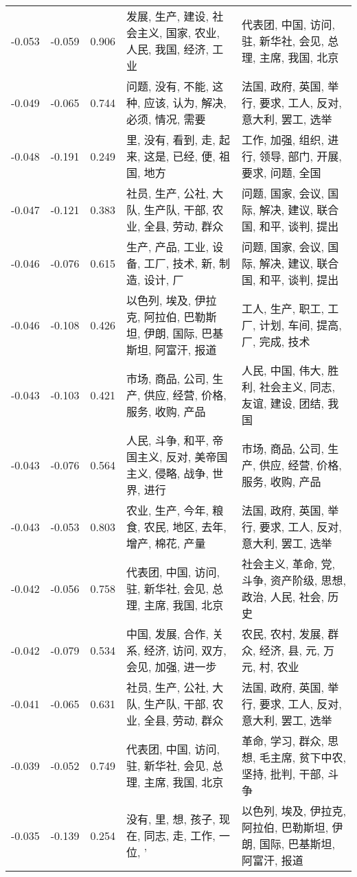 \begin{tabular}{cccp{5cm}p{5cm}}
-0.053 & -0.059 & 0.906 & 发展, 生产, 建设, 社会主义, 国家, 农业, 人民, 我国, 经济, 工业 & 代表团, 中国, 访问, 驻, 新华社, 会见, 总理, 主席, 我国, 北京 \\
-0.049 & -0.065 & 0.744 & 问题, 没有, 不能, 这种, 应该, 认为, 解决, 必须, 情况, 需要 & 法国, 政府, 英国, 举行, 要求, 工人, 反对, 意大利, 罢工, 选举 \\
-0.048 & -0.191 & 0.249 & 里, 没有, 看到, 走, 起来, 这是, 已经, 便, 祖国, 地方 & 工作, 加强, 组织, 进行, 领导, 部门, 开展, 要求, 问题, 全国 \\
-0.047 & -0.121 & 0.383 & 社员, 生产, 公社, 大队, 生产队, 干部, 农业, 全县, 劳动, 群众 & 问题, 国家, 会议, 国际, 解决, 建议, 联合国, 和平, 谈判, 提出 \\
-0.046 & -0.076 & 0.615 & 生产, 产品, 工业, 设备, 工厂, 技术, 新, 制造, 设计, 厂 & 问题, 国家, 会议, 国际, 解决, 建议, 联合国, 和平, 谈判, 提出 \\
-0.046 & -0.108 & 0.426 & 以色列, 埃及, 伊拉克, 阿拉伯, 巴勒斯坦, 伊朗, 国际, 巴基斯坦, 阿富汗, 报道 & 工人, 生产, 职工, 工厂, 计划, 车间, 提高, 厂, 完成, 技术 \\
-0.043 & -0.103 & 0.421 & 市场, 商品, 公司, 生产, 供应, 经营, 价格, 服务, 收购, 产品 & 人民, 中国, 伟大, 胜利, 社会主义, 同志, 友谊, 建设, 团结, 我国 \\
-0.043 & -0.076 & 0.564 & 人民, 斗争, 和平, 帝国主义, 反对, 美帝国主义, 侵略, 战争, 世界, 进行 & 市场, 商品, 公司, 生产, 供应, 经营, 价格, 服务, 收购, 产品 \\
-0.043 & -0.053 & 0.803 & 农业, 生产, 今年, 粮食, 农民, 地区, 去年, 增产, 棉花, 产量 & 法国, 政府, 英国, 举行, 要求, 工人, 反对, 意大利, 罢工, 选举 \\
-0.042 & -0.056 & 0.758 & 代表团, 中国, 访问, 驻, 新华社, 会见, 总理, 主席, 我国, 北京 & 社会主义, 革命, 党, 斗争, 资产阶级, 思想, 政治, 人民, 社会, 历史 \\
-0.042 & -0.079 & 0.534 & 中国, 发展, 合作, 关系, 经济, 访问, 双方, 会见, 加强, 进一步 & 农民, 农村, 发展, 群众, 经济, 县, 元, 万元, 村, 农业 \\
-0.041 & -0.065 & 0.631 & 社员, 生产, 公社, 大队, 生产队, 干部, 农业, 全县, 劳动, 群众 & 法国, 政府, 英国, 举行, 要求, 工人, 反对, 意大利, 罢工, 选举 \\
-0.039 & -0.052 & 0.749 & 代表团, 中国, 访问, 驻, 新华社, 会见, 总理, 主席, 我国, 北京 & 革命, 学习, 群众, 思想, 毛主席, 贫下中农, 坚持, 批判, 干部, 斗争 \\
-0.035 & -0.139 & 0.254 & 没有, 里, 想, 孩子, 现在, 同志, 走, 工作, 一位, ’ & 以色列, 埃及, 伊拉克, 阿拉伯, 巴勒斯坦, 伊朗, 国际, 巴基斯坦, 阿富汗, 报道 \\

\end{tabular}
